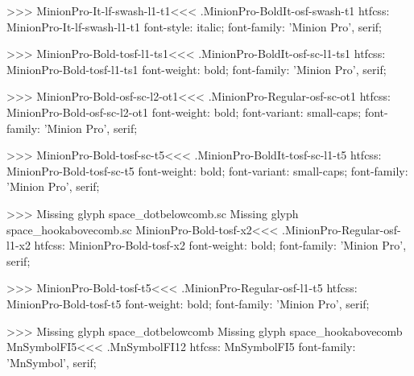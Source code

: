 {>>>
\<MinionPro-It-lf-swash-l1-t1\><<<
.MinionPro-BoldIt-osf-swash-t1
htfcss:  MinionPro-It-lf-swash-l1-t1  font-style: italic; font-family: 'Minion Pro', serif;

>>>
\<MinionPro-Bold-tosf-l1-ts1\><<<
.MinionPro-BoldIt-osf-sc-l1-ts1
htfcss:  MinionPro-Bold-tosf-l1-ts1  font-weight: bold; font-family: 'Minion Pro', serif;

>>>
\<MinionPro-Bold-osf-sc-l2-ot1\><<<
.MinionPro-Regular-osf-sc-ot1
htfcss:  MinionPro-Bold-osf-sc-l2-ot1  font-weight: bold; font-variant: small-caps; font-family: 'Minion Pro', serif;

>>>
\<MinionPro-Bold-tosf-sc-t5\><<<
.MinionPro-BoldIt-tosf-sc-l1-t5
htfcss:  MinionPro-Bold-tosf-sc-t5  font-weight: bold; font-variant: small-caps; font-family: 'Minion Pro', serif;

>>>
Missing glyph	space_dotbelowcomb.sc
Missing glyph	space_hookabovecomb.sc
\<MinionPro-Bold-tosf-x2\><<<
.MinionPro-Regular-osf-l1-x2
htfcss:  MinionPro-Bold-tosf-x2  font-weight: bold; font-family: 'Minion Pro', serif;

>>>
\<MinionPro-Bold-tosf-t5\><<<
.MinionPro-Regular-osf-l1-t5
htfcss:  MinionPro-Bold-tosf-t5  font-weight: bold; font-family: 'Minion Pro', serif;

>>>
Missing glyph	space_dotbelowcomb
Missing glyph	space_hookabovecomb
\<MnSymbolFI5\><<<
.MnSymbolFI12
htfcss:  MnSymbolFI5  font-family: 'MnSymbol', serif;

}
